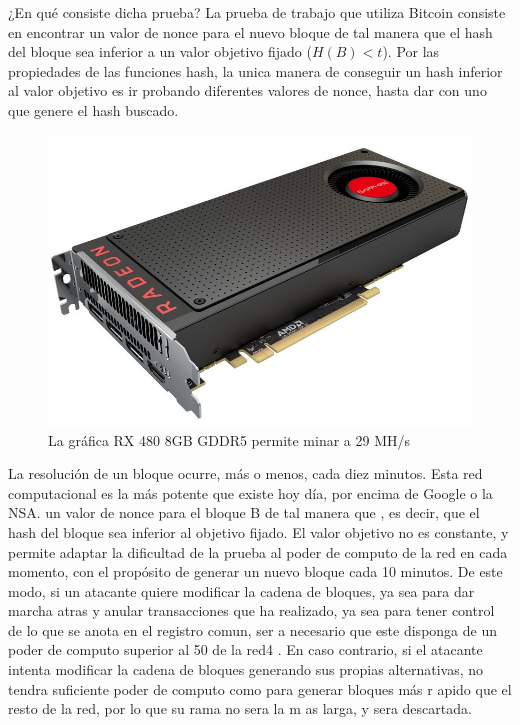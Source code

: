 \documentclass[twoside]{article}
\theoremstyle{definition}
\begin{document}
¿En qué consiste dicha prueba? La prueba de trabajo que utiliza Bitcoin consiste en encontrar un valor de nonce para el nuevo bloque de tal manera que el
hash del bloque sea inferior a un valor objetivo fijado ($H(B) < t$). Por las propiedades de las funciones hash, la unica manera de conseguir un hash inferior al valor objetivo es ir probando diferentes valores de nonce, hasta dar con uno que genere el hash buscado. 
\begin{figure}[h!]
\includegraphics[scale=0.15]{grafica}
\captionsetup{labelformat=empty}
 \caption{La gráfica RX 480 8GB GDDR5 permite minar a  29 MH/s}
\end{figure}

La resolución de un bloque ocurre, más o menos, cada diez minutos. Esta red computacional es la más potente que existe hoy día, por encima de Google o la NSA.
un valor de nonce para el bloque B de tal manera que , es decir, que el hash del bloque sea inferior al objetivo
fijado. El valor objetivo no es constante, y permite adaptar la dificultad de la prueba al poder de computo de la red en cada momento, con el propósito de generar un nuevo bloque cada 10 minutos. De este modo, si un atacante quiere modificar la cadena de bloques, ya sea para dar marcha atras y anular transacciones  que ha realizado, ya sea para tener control de lo que se anota en el registro comun, ser  a necesario que  este disponga de 
un poder de computo superior al  50  de la red4 . En caso contrario, si el atacante intenta modificar la cadena de bloques
generando sus propias alternativas, no tendra suficiente poder 
de computo como para generar bloques más r  apido que el 
resto de la red, por lo que su rama no sera la m  as larga, y 
sera descartada. 
\end{document}
